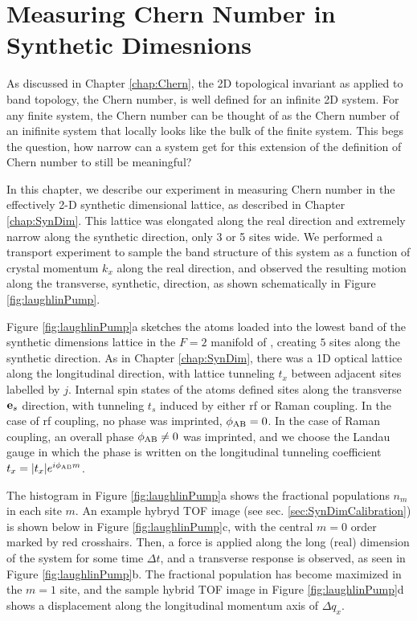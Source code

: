 \renewcommand{\thechapter}{6}

\chapter{Measuring Chern Number in Synthetic Dimesnions}\label{chap:BlochOsc}
As discussed in Chapter \ref{chap:Chern}, the 2D topological invariant as applied to band topology, the Chern number, is well defined for an infinite 2D system. For any finite system, the Chern number can be thought of as the Chern number of an inifinite system that locally looks like the bulk of the finite system. This begs the question, how narrow can a system get for this extension of the definition of Chern number to still be meaningful? 

In this chapter, we describe our experiment in measuring Chern number in the effectively 2-D synthetic dimensional lattice, as described in Chapter \ref{chap:SynDim}. This lattice was elongated along the real direction and extremely narrow along the synthetic direction, only 3 or 5 sites wide. We performed a transport experiment to sample the band structure of this system as a function of crystal momentum $k_x$ along the real direction, and observed the resulting motion along the transverse, synthetic, direction, as shown schematically in Figure \ref{fig:laughlinPump}. 

Figure \ref{fig:laughlinPump}a sketches the atoms loaded into the lowest band of the synthetic dimensions lattice in the $F=2$ manifold of \Rb{}, creating $5$ sites along the synthetic direction. As in Chapter \ref{chap:SynDim}, there was a 1D optical lattice along the longitudinal \ex{} direction, with lattice tunneling $t_x$ between adjacent sites labelled by $j$. Internal spin states of the atoms defined sites along the transverse $\textbf{e}_s{}$ direction, with tunneling $t_s$ induced by either rf or Raman coupling. In the case of rf coupling, no phase was imprinted, $\phi_{\rm AB}=0$. In the case of Raman coupling, an overall phase $\phi_{\rm AB}\neq 0$ was imprinted, and we choose the Landau gauge in which the phase is written on the longitudinal tunneling coefficient $t_x=|t_x|e^{i\phi_{\rm AB}m}$.

The histogram in Figure \ref{fig:laughlinPump}a shows the fractional populations $n_m$ in each site $m$. An example hybryd TOF image (see sec. \ref{sec:SynDimCalibration}) is shown below in Figure \ref{fig:laughlinPump}c, with the central $m=0$ order marked by red crosshairs. Then, a force is applied along the long (real) dimension of the system for some time $\Delta t$, and a transverse response is observed, as seen in  Figure \ref{fig:laughlinPump}b. The fractional population has become maximized in the $m=1$ site, and the sample hybrid TOF image in Figure \ref{fig:laughlinPump}d shows a displacement along the longitudinal momentum axis of $\Delta q_x$. 

